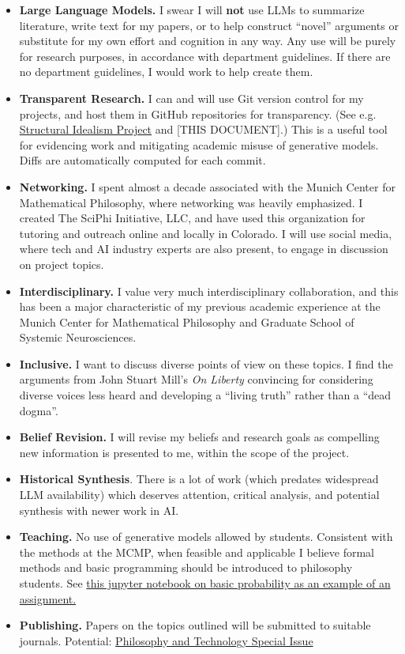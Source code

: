 \documentclass[11pt, oneside]{article}   	%
\begin{document}
\begin{itemize}
    \item \textbf{Large Language Models.}  I swear I will \textbf{not} use LLMs to summarize literature, write text for my papers, or to help construct ``novel'' arguments or substitute for my own effort and cognition in any way. Any use will be purely for research purposes, in accordance with department guidelines.  If there are no department guidelines, I would work to help create them. 
    \item \textbf{Transparent Research.}  I can and will use Git version control for my projects, and host them in GitHub repositories for transparency.  (See e.g. \href{https://github.com/CameronBeebe/Structural_Idealism}{Structural Idealism Project} and [THIS DOCUMENT].)  This is a useful tool for evidencing work and mitigating academic misuse of generative models.  Diffs are automatically computed for each commit.
    \item \textbf{Networking.} I spent almost a decade associated with the Munich Center for Mathematical Philosophy, where networking was heavily emphasized.  I created The SciPhi Initiative, LLC, and have used this organization for tutoring and outreach online and locally in Colorado.  I will use social media, where tech and AI industry experts are also present, to engage in discussion on project topics.
    \item \textbf{Interdisciplinary.}  I value very much interdisciplinary collaboration, and this has been a major characteristic of my previous academic experience at the Munich Center for Mathematical Philosophy and Graduate School of Systemic Neurosciences.
    \item \textbf{Inclusive.}  I want to discuss diverse points of view on these topics.  I find the arguments from John Stuart Mill's \emph{On Liberty} \citep{OnLiberty1859} convincing for considering diverse voices less heard and developing a ``living truth'' rather than a ``dead dogma''.
    \item \textbf{Belief Revision.}  I will revise my beliefs and research goals as compelling new information is presented to me, within the scope of the project.
    \item \textbf{Historical Synthesis}.  There is a lot of work (which predates widespread LLM availability) which deserves attention, critical analysis, and potential synthesis with newer work in AI.
    \item \textbf{Teaching.}  No use of generative models allowed by students.  Consistent with the methods at the MCMP, when feasible and applicable I believe formal methods and basic programming should be introduced to philosophy students.  See \href{https://github.com/CameronBeebe/Probability_Intro/blob/main/Coins.ipynb}{this jupyter notebook on basic probability as an example of an assignment.}
    \item \textbf{Publishing.}  Papers on the topics outlined will be submitted to suitable journals.  Potential: \href{https://link.springer.com/collections/dibibiaidb}{Philosophy and Technology Special Issue}
    
\end{itemize}
\end{document}
